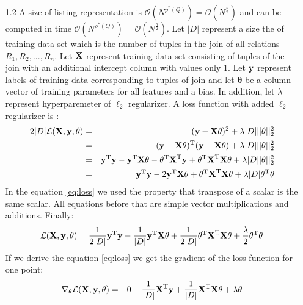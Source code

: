 \documentclass[10pt,a4paper]{article}
\begin{document}
\begin{enumerate}
\item[1.2]
A size of listing representation is $\mathcal{O}(N^{\rho^*(Q)})=\mathcal{O}(N^{\frac{n}{2}})$ and can be computed in time $\mathcal{O}(N^{\rho^*(Q)})=\mathcal{O}(N^{\frac{n}{2}})$. Let $|D|$ represent a size the of training data set which is the number of tuples in the join of all relations $R_1, R_2, ..., R_n$. Let $\textbf{\text{{X}}}$ represent training data set consisting of tuples of the join with an additional intercept column with values only 1. Let $\textbf{\text{{y}}}$ represent labels of training data corresponding to tuples of join and let $\pmb{\theta}$ be a column vector of training parameters for all features and a bias. In addition, let $\lambda$ represent hyperparemeter of $\ell_2$ regularizer.
A loss function with added $\ell_2$ regularizer is :
\begin{eqnarray}
2|D|\mathcal{L}(\textbf{\text{{X}}},\textbf{\text{{y}}}, \mathbf{\theta})  &=& (\textbf{\text{{y}}} - \textbf{\text{{X}}}\mathbf{\theta})^2 \nonumber + \lambda |D| ||\mathbf{\theta}||_2^2\\
			&=& (\textbf{\text{{y}}} - \textbf{\text{{X}}}\mathbf{\theta}) ^ \text{T}(\textbf{\text{{y}}} - \textbf{\text{{X}}}\mathbf{\theta}) + \lambda |D| ||\mathbf{\theta}||_2^2 \nonumber \\
&=&\textbf{\text{{y}}} ^ \text{T}\textbf{\text{{y}}} - \textbf{\text{{y}}} ^ \text{T}\textbf{\text{{X}}}\mathbf{\theta}
- \mathbf{\theta} ^ \text{T}\textbf{\text{{X}}} ^ \text{T} \textbf{\text{{y}}}
+ \mathbf{\theta} ^ \text{T}\textbf{\text{{X}}} ^ \text{T}\textbf{\text{{X}}}\mathbf{\theta} + \lambda |D| |\mathbf{\theta}||_2^2 \nonumber \\
&=&
\textbf{\text{{y}}} ^ \text{T}\textbf{\text{{y}}} - 2 \textbf{\text{{y}}} ^ \text{T}\textbf{\text{{X}}}\mathbf{\theta}
+ \mathbf{\theta} ^ \text{T}\textbf{\text{{X}}} ^ \text{T}\textbf{\text{{X}}}\mathbf{\theta} + \lambda |D| \mathbf{\theta} ^ \text{T}\mathbf{\theta}
\label{eq:loss}
\end{eqnarray}
In the equation \ref{eq:loss} we used the property that transpose of a scalar is the same scalar. All equations before that are simple vector multiplications and additions. 
Finally: 
$$\mathcal{L}(\textbf{\text{{X}}},\textbf{\text{{y}}}, \mathbf{\theta}) = 
\frac{1}{2|D|} \textbf{\text{{y}}} ^ \text{T}\textbf{\text{{y}}} - \frac{1}{|D|} \textbf{\text{{y}}} ^ \text{T}\textbf{\text{{X}}}\mathbf{\theta}
+ \frac{1}{2|D|}\mathbf{\theta} ^ \text{T}\textbf{\text{{X}}} ^ \text{T}\textbf{\text{{X}}}\mathbf{\theta} + 
\frac{\lambda}{2} \mathbf{\theta} ^ \text{T}\mathbf{\theta}
$$
If we derive the equation \ref{eq:loss} we get the gradient of the loss function for one point:
\begin{eqnarray}
\nabla_{\mathbf{\theta}} \mathcal{L}(\mat{X},\vect{y}, \mathbf{\theta}) &=& 0  - \frac{1}{|D|}\transpose{\mat{X}}\vect{y} + \frac{1}{|D|}\transpose{\mat{X}}\mat{X}\mathbf{\theta} + \lambda \mathbf{\theta} \nonumber \\

\end{eqnarray}
\end{enumerate}
\end{document}

